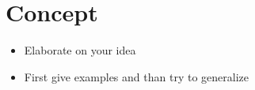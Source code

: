 \section{Concept}
\label{sec:concept}
\begin{itemize}
	\item Elaborate on your idea
	\item First give examples and than try to generalize
\end{itemize}